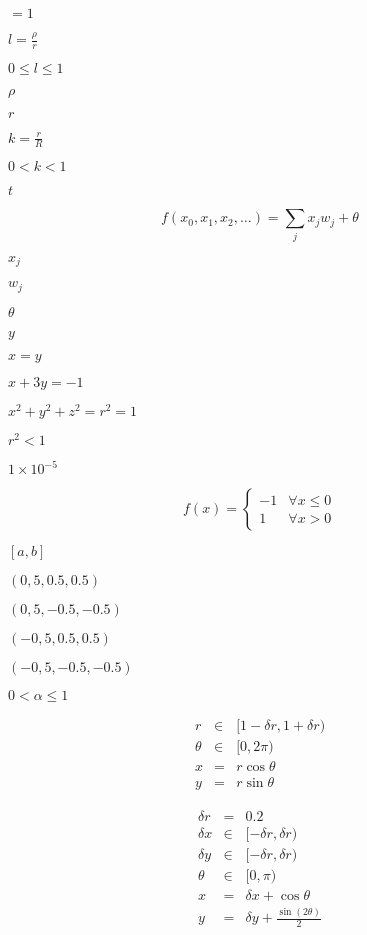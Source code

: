 \documentclass{article}
\begin{document}
$=1$
\pagebreak

$l=\frac{\rho}{r}$
\pagebreak

$0\le l\le1$
\pagebreak

$\rho$
\pagebreak

$r$
\pagebreak

$k=\frac{r}{R}$
\pagebreak

$0<k<1$
\pagebreak

$t$
\pagebreak

\[ f\left(x_0,x_1,x_2,\ldots\right) =
\sum_j x_jw_j+\theta
\]
\pagebreak

$x_j$
\pagebreak

$w_j$
\pagebreak

$\theta$
\pagebreak

$y$
\pagebreak

$x=y$
\pagebreak

$x+3y=-1$
\pagebreak

$x^2+y^2+z^2=r^2=1$
\pagebreak

$r^2<1$
\pagebreak

$1\times10^{-5}$
\pagebreak

\[
f(x) = \begin{cases}
-1 & \forall x \le 0\\
 1 & \forall x > 0
\end{cases}
\]
\pagebreak

$[a,b]$
\pagebreak

$(0,5, 0.5, 0.5)$
\pagebreak

$(0,5,-0.5, -0.5)$
\pagebreak

$(-0,5, 0.5, 0.5)$
\pagebreak

$(-0,5,-0.5, -0.5)$
\pagebreak

$0<\alpha\le1$
\pagebreak

\begin{eqnarray*}
r &\in& [1-\delta r, 1+\delta r)\\
\theta &\in& [0, 2\pi)\\
x &=& r\cos\theta\\
y &=& r\sin\theta
\end{eqnarray*}
\pagebreak

\begin{eqnarray*}
\delta r &=& 0.2\\
\delta x &\in& [-\delta r, \delta r)\\
\delta y &\in& [-\delta r, \delta r)\\
\theta &\in& [0, \pi)\\
x &=& \delta x + \cos\theta\\
y &=& \delta y + \frac{\sin(2\theta)}{2}
\end{eqnarray*}
\pagebreak
\end{document}
